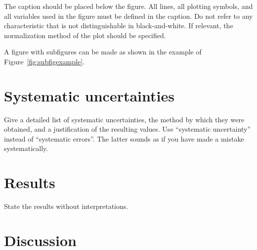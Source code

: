 \documentclass[11pt,a4paper]{cepcnote}
\begin{document}
The caption should be placed below the figure.  All lines, all
plotting symbols, and all variables used in the figure must be defined
in the caption. Do not refer to any characteristic that is not
distinguishable in black-and-white.  If relevant, the normalization
method of the plot should be specified.

A figure with subfigures can be made as shown in the example of
Figure~\ref{fig:subfigexample}.

%
%
%
\section{Systematic uncertainties}

Give a detailed list of systematic uncertainties, the method
by which they were obtained, and a justification of the resulting
values.
%
Use ``systematic uncertainty'' instead of ``systematic errors''.
The latter sounds as if you have made a mistake systematically.

%
%
\section{Results}

State the results without interpretations.

%
%
\section{Discussion}
\end{document}
